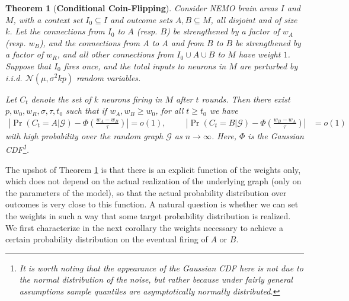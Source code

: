 \documentclass{article}
\newtheorem{theorem}{Theorem}
\theoremstyle{remark}
\newcommand{\1}{\mathbbm{1}}
\begin{document}
\begin{theorem}[\textbf{Conditional Coin-Flipping}] \label{thm:coinflip}
    Consider NEMO brain areas $I$ and $M$, with a context set $I_0 \subseteq I$ and outcome sets $A, B \subseteq M$, all disjoint and of size $k$. Let the connections from $I_0$ to $A$ (resp. $B$) be strengthened by a factor of $w_A$ (resp. $w_B$), and the connections from $A$ to $A$ and from $B$ to $B$ be strengthened by a factor of $w_R$, and all other connections from $I_0 \cup A \cup B$ to $M$ have weight $1$. Suppose that $I_0$ fires once, and the total inputs to neurons in $M$ are perturbed by i.i.d. $\mathcal N(\mu, \sigma^2 kp)$ random variables. 
    
    Let $C_t$ denote the set of $k$ neurons firing in $M$ after $t$ rounds. Then there exist $p, w_0, w_R, \sigma, \tau, t_0$ such that if $w_A, w_B \ge w_0$, for all $t \ge t_0$ we have
    \begin{align*}
        \left|\Pr(C_t = A | \mathcal G) - \Phi\left( \frac{w_A - w_B}{\tau}\right) \right| = o(1),\hspace{1cm} \left|\Pr(C_t = B | \mathcal G) - \Phi\left(\frac{w_B - w_A}{\tau}\right) \right| &= o(1)
    \end{align*} with high probability over the random graph $\mathcal G$ as $n \to \infty$. Here, $\Phi$ is the Gaussian CDF\footnote{It is worth noting that the appearance of the Gaussian CDF here is \emph{not} due to the normal distribution of the noise, but rather because under fairly general assumptions sample quantiles are asymptotically normally distributed.}.
\end{theorem}

The upshot of Theorem \ref{thm:coinflip} is that there is an explicit function of the weights only, which does not depend on the actual realization of the underlying graph (only on the parameters of the model), so that the actual probability distribution over outcomes is very close to this function.
A natural question is whether we can set the weights in such a way that some target probability distribution is realized. 
We first characterize in the next corollary the weights necessary to achieve a certain probability distribution on the eventual firing of $A$ or $B$.
\end{document}

